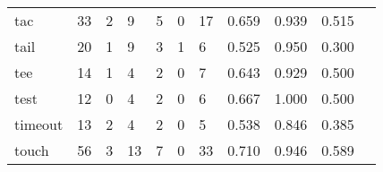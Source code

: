 \begin{longtable}{lp{1.2cm}p{1.2cm}p{1.2cm}p{1.2cm}p{1.2cm}p{1.2cm}p{1.2cm}p{1.2cm}p{1.2cm}p{1.2cm}}
tac       &                                    33 &                                                  2 &                                                  9 &                                                  5 &                                                  0 &                                                 17 &                                              0.659 &                                              0.939 &                                              0.515 \\
tail      &                                    20 &                                                  1 &                                                  9 &                                                  3 &                                                  1 &                                                  6 &                                              0.525 &                                              0.950 &                                              0.300 \\
tee       &                                    14 &                                                  1 &                                                  4 &                                                  2 &                                                  0 &                                                  7 &                                              0.643 &                                              0.929 &                                              0.500 \\
test      &                                    12 &                                                  0 &                                                  4 &                                                  2 &                                                  0 &                                                  6 &                                              0.667 &                                              1.000 &                                              0.500 \\
timeout   &                                    13 &                                                  2 &                                                  4 &                                                  2 &                                                  0 &                                                  5 &                                              0.538 &                                              0.846 &                                              0.385 \\
touch     &                                    56 &                                                  3 &                                                 13 &                                                  7 &                                                  0 &                                                 33 &                                              0.710 &                                              0.946 &                                              0.589 \\

\end{longtable}
